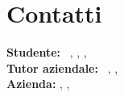 \section*{Contatti}
\textbf{Studente:} \nomeStudente\ \cognomeStudente, \href{mailto:\emailStudente}{\emailStudente}, \href{mailto:\emailPersonaleStudente}{\emailPersonaleStudente}, \telStudente \\
\textbf{Tutor aziendale:} \nomeTutorAziendale\ \cognomeTutorAziendale, \href{mailto:\emailTutorAziendale}{\emailTutorAziendale}, \telTutorAziendale \\
\textbf{Azienda:} \ragioneSocAzienda, \indirizzoAzienda, \href{\sitoAzienda}{\sitoAzienda}